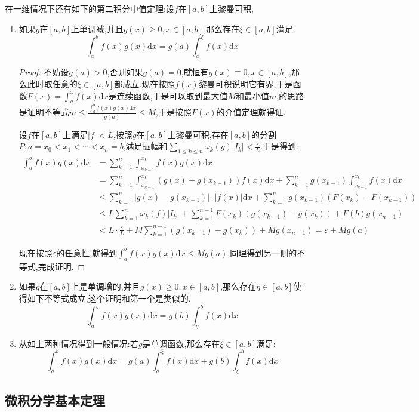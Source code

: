 在一维情况下还有如下的第二积分中值定理:设$f$在$[a,b]$上黎曼可积,
\begin{enumerate}
	\item 如果$g$在$[a,b]$上单调减,并且$g(x)\ge0,x\in[a,b]$,那么存在$\xi\in[a,b]$满足:$$\int_a^bf(x)g(x)\mathrm{d}x=g(a)\int_a^{\xi}f(x)\mathrm{d}x$$
	\begin{proof}
		
		不妨设$g(a)>0$,否则如果$g(a)=0$,就恒有$g(x)\equiv0,x\in[a,b]$,那么此时取任意的$\xi\in[a,b]$都成立.现在按照$f(x)$黎曼可积说明它有界,于是函数$F(x)=\int_a^xf(x)\mathrm{d}x$是连续函数,于是可以取到最大值$M$和最小值$m$,的思路是证明不等式$m\le\frac{\int_a^bf(x)g(x)\mathrm{d}x}{g(a)}\le M$,于是按照$F(x)$的介值定理就得证.
		
		设$f$在$[a,b]$上满足$|f|<L$,按照$g$在$[a,b]$上黎曼可积,存在$[a,b]$的分割$P:a=x_0<x_1<\cdots<x_n=b$,满足振幅和$\sum_{1\le k\le n}\omega_k(g)|I_k|<\frac{\varepsilon}{L}$.于是得到:
		\begin{align*}
		\int_a^bf(x)g(x)\mathrm{d}x &=\sum_{k=1}^{n}\int_{x_{k-1}}^{x_k}f(x)g(x)\mathrm{d}x \\
		&=\sum_{k=1}^{n}\int_{x_{k-1}}^{x_k}\left(g(x)-g(x_{k-1})\right)f(x)\mathrm{d}x+\sum_{k=1}^{n}g(x_{k-1})\int_{x_{k-1}}^{x_k}f(x)\mathrm{d}x \\
		&\le\sum_{k=1}^{n}\left|g(x)-g(x_{k-1})\right|\cdot\left|f(x)\right|\mathrm{d}x+\sum_{k=1}^{n}g(x_{k-1})\left(F(x_k)-F(x_{k-1})\right) \\
		&\le L\sum_{k=1}^{n}\omega_k(f)|I_k|+\sum_{k=1}^{n-1}F(x_k)\left(g(x_{k-1})-g(x_k)\right)+F(b)g(x_{n-1}) \\
		&<L\cdot\frac{\varepsilon}{L}+M\sum_{k=1}^{n-1}\left(g(x_{k-1})-g(x_k)\right)+Mg(x_{n-1})=\varepsilon+Mg(a)
		\end{align*}
		
		现在按照$\varepsilon$的任意性,就得到$\int_a^bf(x)g(x)\mathrm{d}x\le Mg(a)$,同理得到另一侧的不等式,完成证明.
	\end{proof}
	\item 如果$g$在$[a,b]$上是单调增的,并且$g(x)\ge0,x\in[a,b]$,那么存在$\eta\in[a,b]$使得如下不等式成立,这个证明和第一个是类似的.
	$$\int_a^bf(x)g(x)\mathrm{d}x=g(b)\int_{\eta}^bf(x)\mathrm{d}x$$
	\item 从如上两种情况得到一般情况:若$g$是单调函数,那么存在$\xi\in[a,b]$满足:
	$$\int_a^bf(x)g(x)\mathrm{d}x=g(a)\int_a^{\xi}f(x)\mathrm{d}x+g(b)\int_{\xi}^bf(x)\mathrm{d}x$$
\end{enumerate}
\newpage
\subsection{微积分学基本定理}

